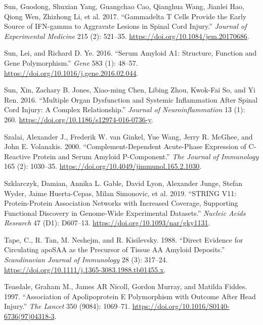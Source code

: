 \documentclass[9pt,lineno]{elife}
\newlength{\cslhangindent}
\newlength{\cslentryspacingunit} %
\newenvironment{CSLReferences}[2] %
 {%
  \setlength{\parindent}{0pt}
  \ifodd #1
  \let\oldpar\par
  \def\par{\hangindent=\cslhangindent\oldpar}
  \fi
  \setlength{\parskip}{#2\cslentryspacingunit}
 }%
 {}
\begin{document}
\begin{CSLReferences}{1}{0}
\leavevmode{}%
Sun, Guodong, Shuxian Yang, Guangchao Cao, Qianghua Wang, Jianlei Hao, Qiong Wen, Zhizhong Li, et al. 2017. {``Gammadelta {T} Cells Provide the Early Source of {IFN-gamma} to Aggravate Lesions in Spinal Cord Injury.''} \emph{Journal of Experimental Medicine} 215 (2): 521--35. \url{https://doi.org/10.1084/jem.20170686}.

\leavevmode{}%
Sun, Lei, and Richard D. Ye. 2016. {``Serum Amyloid {A1}: {Structure}, Function and Gene Polymorphism.''} \emph{Gene} 583 (1): 48--57. \url{https://doi.org/10.1016/j.gene.2016.02.044}.

\leavevmode{}%
Sun, Xin, Zachary B. Jones, Xiao-ming Chen, Libing Zhou, Kwok-Fai So, and Yi Ren. 2016. {``Multiple Organ Dysfunction and Systemic Inflammation After Spinal Cord Injury: A Complex Relationship.''} \emph{Journal of Neuroinflammation} 13 (1): 260. \url{https://doi.org/10.1186/s12974-016-0736-y}.

\leavevmode{}%
Szalai, Alexander J., Frederik W. van Ginkel, Yue Wang, Jerry R. McGhee, and John E. Volanakis. 2000. {``Complement-{Dependent Acute-Phase Expression} of {C-Reactive Protein} and {Serum Amyloid P-Component}.''} \emph{The Journal of Immunology} 165 (2): 1030--35. \url{https://doi.org/10.4049/jimmunol.165.2.1030}.

\leavevmode{}%
Szklarczyk, Damian, Annika L. Gable, David Lyon, Alexander Junge, Stefan Wyder, Jaime Huerta-Cepas, Milan Simonovic, et al. 2019. {``{STRING} V11: Protein-Protein Association Networks with Increased Coverage, Supporting Functional Discovery in Genome-Wide Experimental Datasets.''} \emph{Nucleic Acids Research} 47 (D1): D607--13. \url{https://doi.org/10.1093/nar/gky1131}.

\leavevmode{}%
Tape, C., R. Tan, M. Neshejm, and R. Kisilevsky. 1988. {``Direct {Evidence} for {Circulating apoSAA} as the {Precursor} of {Tissue AA Amyloid Deposits}.''} \emph{Scandinavian Journal of Immunology} 28 (3): 317--24. \url{https://doi.org/10.1111/j.1365-3083.1988.tb01455.x}.

\leavevmode{}%
Teasdale, Graham M., James AR Nicoll, Gordon Murray, and Matilda Fiddes. 1997. {``Association of Apolipoprotein {E} Polymorphism with Outcome After Head Injury.''} \emph{The Lancet} 350 (9084): 1069--71. \url{https://doi.org/10.1016/S0140-6736(97)04318-3}.


\end{CSLReferences}
\end{document}
